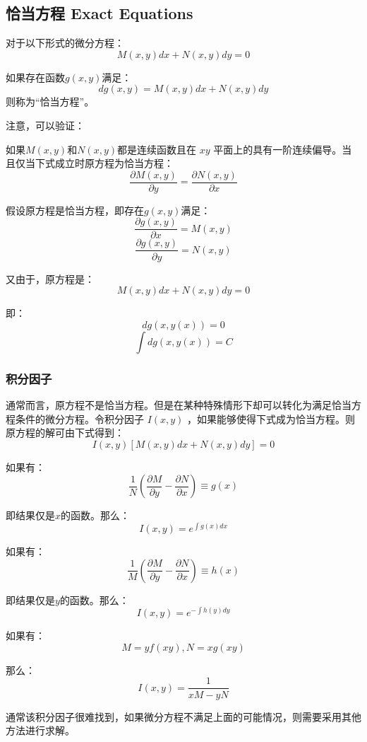 \documentclass[12pt]{article}
\begin{document}
\subsection{恰当方程 Exact Equations}
对于以下形式的微分方程：
$$
M(x,y)dx + N(x,y)dy = 0
$$

如果存在函数$g(x,y)$满足：
$$
dg(x,y) = M(x,y)dx + N(x,y)dy
$$
则称为“恰当方程”。

注意，可以验证：

如果$M(x,y)$和$N(x,y)$都是连续函数且在 $xy$ 平面上的具有一阶连续偏导。当且仅当下式成立时原方程为恰当方程：
$$
\frac{\partial M(x,y)}{\partial y} = \frac{\partial N(x,y)}{\partial x}
$$

假设原方程是恰当方程，即存在$g(x,y)$满足：
$$
\frac{\partial g(x,y)}{\partial x} = M(x,y)
$$
$$
\frac{\partial g(x,y)}{\partial y} = N(x,y)
$$

又由于，原方程是：
$$
M(x,y)dx + N(x,y)dy = 0
$$

即：
$$
dg(x,y(x)) = 0
$$
$$
\int dg(x,y(x)) = C
$$

\subsubsection{积分因子}
通常而言，原方程不是恰当方程。但是在某种特殊情形下却可以转化为满足恰当方程条件的微分方程。令积分因子 $I(x,y)$ ，如果能够使得下式成为恰当方程。则原方程的解可由下式得到：
$$
I(x,y)[M(x,y)dx + N(x,y)dy] = 0
$$

如果有：
$$
\frac{1}{N}(\frac{\partial M}{\partial y} - \frac{\partial N}{\partial x}) \equiv g(x)
$$

即结果仅是$x$的函数。那么：
$$
I(x,y) = e^{\int g(x)dx}
$$

如果有：
$$
\frac{1}{M}(\frac{\partial M}{\partial y} - \frac{\partial N}{\partial x}) \equiv h(x)
$$

即结果仅是$y$的函数。那么：
$$
I(x,y) = e^{-\int h(y)dy}
$$

如果有：
$$
M = yf(xy), N = xg(xy)
$$

那么：
$$
I(x,y) = \frac{1}{xM - yN}
$$

通常该积分因子很难找到，如果微分方程不满足上面的可能情况，则需要采用其他方法进行求解。
\end{document}
